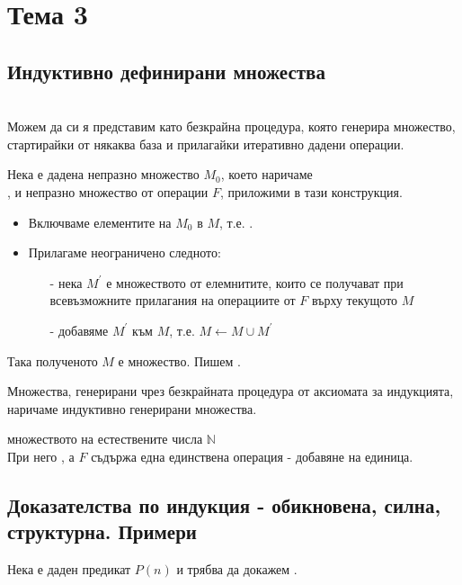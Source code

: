 \section{Тема 3}

\subsection{Индуктивно дефинирани множества}
 \\
Можем да си я представим като безкрайна процедура, която генерира
множество, стартирайки от някаква база и прилагайки итеративно дадени операции.

Нека е дадена непразно множество \(M_0\), което наричаме \\ , и непразно множество
от операции \(F\), приложими в тази конструкция.

\begin{itemize}
    \item Включваме елементите на \(M_0\) в \(M\), т.е. .
    \item Прилагаме неограничено следното:
        \begin{itemize}
            \item[-] нека \(M^{'}\) е множеството от елемнитите, които се получават при всевъзможните 
            прилагания на операциите от \(F\) върху текущото \(M\)
            \item[-] добавяме \(M^{'}\) към \(M\), т.е. \(M \leftarrow M \cup M^{'}\)
        \end{itemize}
\end{itemize}

Така полученото \(M\) е множество. Пишем .

Множества, генерирани чрез безкрайната процедура от аксиомата за индукцията, наричаме индуктивно генерирани
множества.

 множеството на естествените числа \(\mathbb{N}\) \\
При него , а \(F\) съдържа една единствена операция - добавяне на единица.

\subsection{Доказателства по индукция - обикновена, силна, структурна. Примери}
Нека е даден предикат \(P(n)\) и трябва да докажем .

